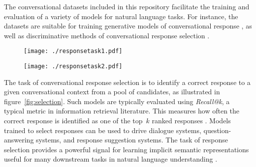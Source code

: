 \documentclass[11pt,a4paper,table]{article}
\begin{document}
The conversational datasets included in this repository facilitate the training and evaluation of a variety of models for natural language tasks. For instance, the datasets are suitable for training generative models of conversational response \cite{serban2016generative,Ritter:2011,VinyalsL15,SordoniGABJMNGD15,ShangLL15,Kannan:2016kdd}, as well as discriminative methods of conversational response selection \cite{Lowe2015TheUD, inaba2016neural, yu2016strategy,Henderson:2017arxiv}.

\begin{figure*}[t]
    \centering
    \begin{subfigure}[t]{0.48\linewidth}
        \centering
        \texttt{[image: ./responsetask1.pdf]}
\label{fig:ex1}
    \end{subfigure}\hspace{1em}
    \begin{subfigure}[t]{0.48\textwidth}
        \centering
        \texttt{[image: ./responsetask2.pdf]}
\label{fig:ex2}
    \end{subfigure}
    \vspace{-2mm}
	\caption{Two examples illustrating the conversational response selection task: given the input context sentence, the goal is to identify the relevant response from a large pool of candidate responses.}
\vspace{-2.5mm}
\label{fig:selection}
\end{figure*}

The task of conversational response selection is to identify a correct response to a given conversational context from a pool of candidates, as illustrated in figure~\ref{fig:selection}. Such models are typically evaluated using \emph{Recall@k}, a typical metric in information retrieval literature. This measures how often the correct response is identified as one of the top~$k$ ranked responses \cite{Lowe2015TheUD, inaba2016neural, yu2016strategy, AlRfou:2016arxiv, Henderson:2017arxiv, Lowe:2017dd, Wu:2017acl, Cer:2018arxiv, Chaudhuri:2018conll, Du:2018scai, Kumar2018, liu2018customized, Yang:2018repl, Zhou:2018acl, gunasekara2019dstc7, Tao:2019wsdm}.  Models trained to select responses can be used to drive dialogue systems, question-answering systems, and response suggestion systems. The task of response selection provides a powerful signal for learning implicit semantic representations useful for many downstream tasks in natural language understanding \cite{Cer:2018arxiv, Yang:2018repl}.
\end{document}
